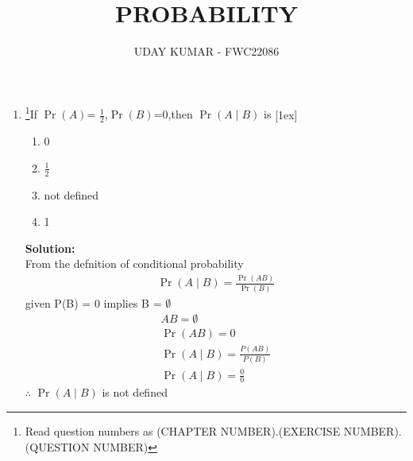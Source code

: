 \documentclass{article}
\providecommand{\pr}[1]{\ensuremath{\Pr\left(#1\right)}}
\newcommand{\solution}{\noindent \textbf{Solution: }}
\begin{document}
\title{PROBABILITY}
\author{\Large UDAY KUMAR - FWC22086}
\date{}

\maketitle

\begin{enumerate}[label=13.\arabic{enumi}.\arabic{enumii}]%
\setcounter{enumi}{0}
\setcounter{enumii}{6}

\item \footnote{Read question numbers as (CHAPTER NUMBER).(EXERCISE NUMBER).(QUESTION NUMBER)}{If \pr{A}= $\frac{1}{2}$,\pr{B}=0,then \pr{A \mid B} is }[1ex]
\begin{enumerate}
\item 0
\item $\frac{1}{2}$
\item not defined
\item 1
\end{enumerate}
	\solution\\
		From the defnition of conditional probability\\
\begin{align}
&\pr{A \mid B} = \frac{\pr{A B}}{\pr{B}}&
\end{align}
given P(B) = 0 implies  B = $\emptyset$ 
\begin{align}
&AB = \emptyset&\\
&\pr{A B} =0&\\
&\pr{A \mid B} = \frac{P(AB)}{P(B)}&\\
&\pr{A \mid B} = \frac{0}{0}&
\end{align}
$\therefore$ \pr{A \mid B} is not defined
\end{enumerate}
\end{document}
